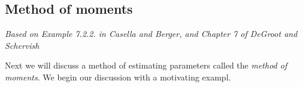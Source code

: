 \documentclass[10pt]{article}
\theoremstyle{definition}
\newcommand{\1}[1]{\textbf{1}_{\left[#1\right]}} %
\def\P{\mathbb{P}} %
\begin{document}





\subsection{Method of moments}

\textit{Based on Example 7.2.2. in Casella and Berger, and Chapter 7 of
  DeGroot and Schervish}

Next we will discuss a method of estimating parameters called the \textit{method of
  moments}. We begin our discussion with a motivating exampl.
\end{document}
